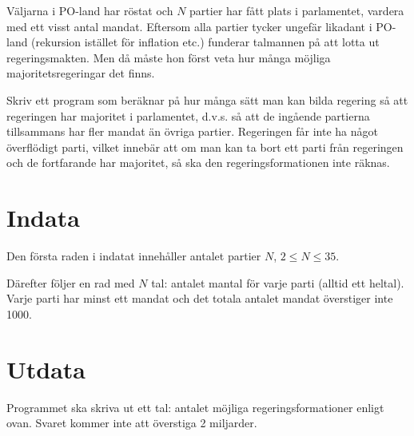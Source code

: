 
Väljarna i PO-land har röstat och $N$ partier har fått plats i parlamentet, vardera med ett
visst antal mandat. Eftersom alla partier tycker ungefär likadant i PO-land (rekursion
istället för inflation etc.) funderar talmannen på att lotta ut regeringsmakten. Men då
måste hon först veta hur många möjliga majoritetsregeringar det finns.

Skriv ett program som beräknar på hur många sätt man kan bilda regering så att regeringen
har majoritet i parlamentet, d.v.s. så att de ingående partierna tillsammans har
fler mandat än övriga partier. Regeringen får inte ha något överflödigt parti, vilket innebär
att om man kan ta bort ett parti från regeringen och de fortfarande har majoritet,
så ska den regeringsformationen inte räknas.

\section*{Indata}

Den första raden i indatat innehåller antalet partier $N$, $2 \le N \le 35$.

Därefter följer en rad med $N$ tal: antalet mantal för varje parti (alltid ett heltal).
Varje parti har minst ett mandat och det totala antalet mandat överstiger inte 1000.

\section*{Utdata}

Programmet ska skriva ut ett tal: antalet möjliga regeringsformationer enligt ovan.
Svaret kommer inte att överstiga 2 miljarder.

